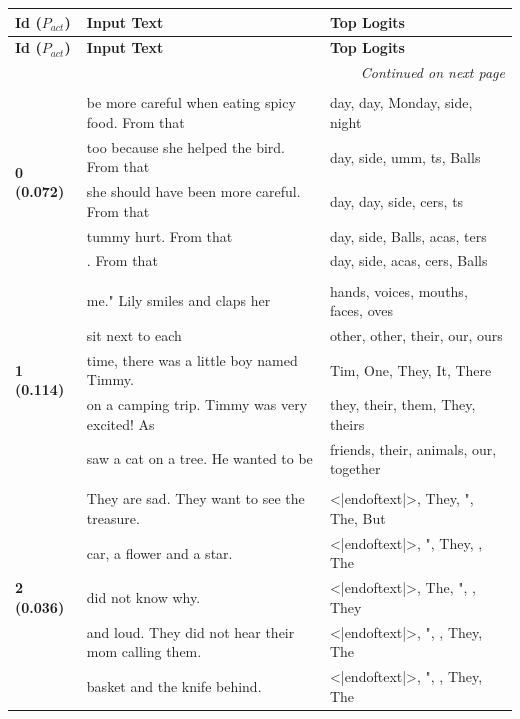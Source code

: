 \documentclass{article}
\theoremstyle{plain}
\theoremstyle{definition}
\theoremstyle{remark}
\begin{document}
\onecolumn
\footnotesize
\begin{longtable}{|p{}|p{}|p{}|}
\hline
\textbf{Id ($P_{act}$)} & \textbf{Input Text} & \textbf{Top Logits} \\
\hline
\endfirsthead  %
\hline
\textbf{Id ($P_{act}$)} & \textbf{Input Text} & \textbf{Top Logits} \\
\hline
\endhead

\hline
\multicolumn{3}{r}{\textit{Continued on next page}} \\
\hline
\endfoot

\hline
\endlastfoot
& & \\
\multirow{5}{*}{\textbf{0 (0.072)}} & be more careful when eating spicy food. From that & day, day,  Monday, side, night \\
& too because she helped the bird. From that & day, side, umm, ts,  Balls \\
& she should have been more careful. From that & day, day, side, cers, ts \\
& tummy hurt. From that & day, side,  Balls, acas, ters \\
& . From that & day, side, acas, cers,  Balls \\
& & \\
\multirow{5}{*}{\textbf{1 (0.114)}} & me."  Lily smiles and claps her & hands,  voices,  mouths,  faces, oves \\
& sit next to each & other, other,  their,  our,  ours \\
& time, there was a little boy named Timmy. & Tim,  One,  They,  It,  There \\
& on a camping trip. Timmy was very excited!   As & they,  their,  them, They,  theirs \\
& saw a cat on a tree. He wanted to be & friends,  their,  animals,  our,  together \\
& & \\
\multirow{5}{*}{\textbf{2 (0.036)}} & They are sad. They want to see the treasure. & <|endoftext|>, They, ", The, But \\
& car, a flower and a star. & <|endoftext|>, ", They,  , The \\
& did not know why. & <|endoftext|>, The, ",  , They \\
& and loud. They did not hear their mom calling them. & <|endoftext|>, ",  , They, The \\
& basket and the knife behind. & <|endoftext|>, ",  , They, The \\

\end{longtable}
\end{document}
